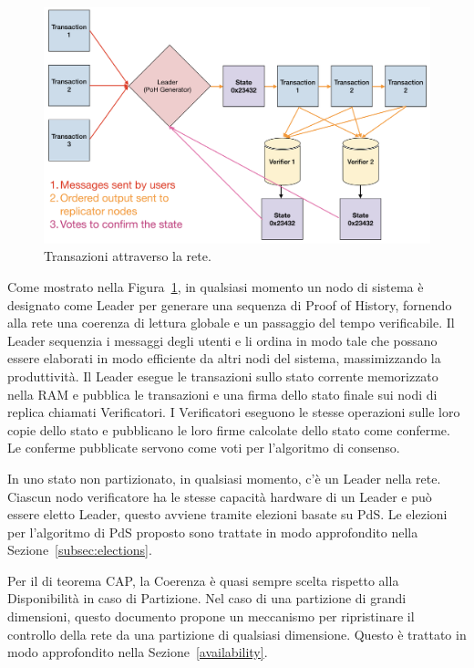 \documentclass[12pt]{article}
\begin{document}
\begin{figure}[h]
  \begin{center}
    \centering
    \includegraphics[width=\textwidth]{figures/network_design_001.png}
    \caption[Fig 1]{Transazioni attraverso la rete.\label{fig:design}}
  \end{center}
  \end{figure}

Come mostrato nella Figura~\ref{fig:design}, in qualsiasi momento un nodo di sistema è designato come Leader per generare una sequenza di Proof of History, fornendo alla rete una coerenza di lettura globale e un passaggio del tempo verificabile. Il Leader sequenzia i messaggi degli utenti e li ordina in modo tale che possano essere elaborati in modo efficiente da altri nodi del sistema, massimizzando la produttività. Il Leader esegue le transazioni sullo stato corrente memorizzato nella RAM e pubblica le transazioni e una firma dello stato finale sui nodi di replica chiamati Verificatori. I Verificatori eseguono le stesse operazioni sulle loro copie dello stato e pubblicano le loro firme calcolate dello stato come conferme. Le conferme pubblicate servono come voti per l'algoritmo di consenso.

In uno stato non partizionato, in qualsiasi momento, c'è un Leader nella rete. Ciascun nodo verificatore ha le stesse capacità hardware di un Leader e può essere eletto Leader, questo avviene tramite elezioni basate su PdS. Le elezioni per l'algoritmo di PdS proposto sono trattate in modo approfondito nella Sezione~\ref{subsec:elections}.

Per il di teorema CAP, la Coerenza è quasi sempre scelta rispetto alla Disponibilità in caso di Partizione. Nel caso di una partizione di grandi dimensioni, questo documento propone un meccanismo per ripristinare il controllo della rete da una partizione di qualsiasi dimensione. Questo è trattato in modo approfondito nella Sezione~\ref{availability}.	
\end{document}
